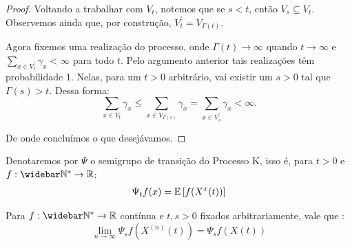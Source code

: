 \begin{proof}
  Voltando a trabalhar com $V_t$, notemos que se $s < t$, então $V_s
  \subseteq V_t$. Observemos ainda que, por construção, $V^\prime_t =
  V_{\Gamma(t)}$.

  Agora fixemos uma realização do processo, onde $\Gamma(t) \to
  \infty$ quando $t \to \infty$ e $\sum_{x \in V^\prime_t} \gamma_x <
  \infty$ para todo $t$. Pelo argumento anterior tais realizações têm
  probabilidade $1$. Nelas, para um $t > 0$ arbitrário, vai existir
  um $s > 0$ tal que $\Gamma(s) > t$. Dessa forma:
  \begin{displaymath}
    \sum_{x \in V_t} \gamma_x \leq \sum_{x \in V_{\Gamma(s)}}
    \gamma_x =
    \sum_{x \in V^\prime_s} \gamma_x < \infty.
  \end{displaymath}

  De onde concluímos o que desejávamos.
\end{proof}


\begin{definicao}
  \label{def:semigrupo}
  Denotaremos por $\Psi$ o semigrupo de transição do Processo K, isso
  é, para $t > 0$ e $f: \Nzb \to \R$:
  \begin{gather*}
    \Psi_t f (x) = {\mathbb{E}} \left[ f(X^x(t)) \right]\\
  \end{gather*}
\end{definicao}


\begin{proposicao}
  \label{prop:semigrupo-quase-continuo}
  Para $f: \Nzb \to \R$ contínua e $t, s > 0$ fixados arbitrariamente,
  vale que \qc:
  \begin{equation}
    \label{eq:semigrupo-quase-continuo}
    \lim_{n \to \infty} \Psi_s f (X^{(n)}(t)) = \Psi_s f(X(t))
  \end{equation}
\end{proposicao}

